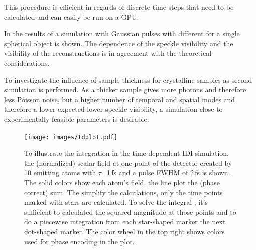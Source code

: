 This procedure is efficient in regards of discrete time steps that need to be calculated and can easily be run on a GPU.

In  the results of a simulation with Gaussian pulses with different for a single spherical object is shown. The dependence of the speckle visibility and the visibility of the reconstructions is in agreement with the theoretical considerations.

To investigate the influence of sample thickness for crystalline samples as second simulation is performed. As a thicker sample gives more photons and therefore less Poisson noise, but a higher number of temporal and spatial modes and therefore a lower expected lower speckle visibility, a simulation close to experimentally feasible parameters is desirable.



\begin{figure}
	   \centering
		\texttt{[image: images/tdplot.pdf]}
	\caption[Integration in Time Dependent IDI Simulation]{To illustrate the integration in the time dependent IDI simulation, the (normalized) scalar field at one point of the detector created by 10 emitting atoms with $\tau$=1\,fs and a pulse FWHM of 2\,fs is shown. The solid colors show each atom's field, the line plot the (phase correct) sum. The simplify the calculations, only the time points marked with stars are calculated. To solve the integral , it's sufficient to calculated the squared magnitude at those points and to do a piecewise integration from each star-shaped marker the next dot-shaped marker. The color wheel in the top right shows colors used for phase encoding in the plot.}
	\label{fig:tdplot}
\end{figure}


